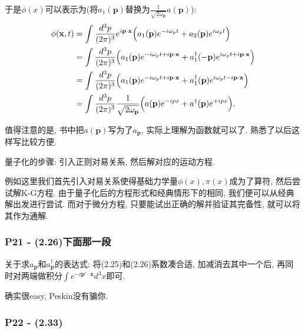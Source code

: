 \documentclass[cn,hazy,green,11pt,device=normal,chinesefont=founder]{elegantnote}
\begin{document}
于是$\phi(x)$可以表示为(将$a_1(\mathbf{p})$替换为$\frac{1}{\sqrt{2\omega_\mathbf{p}}} a(\mathbf{p})$): 
\begin{equation}
  \begin{aligned}
  \phi(\mathbf{x}, t) &= \int \frac{d^3 p}{(2\pi)^3}e^{i\mathbf{p \cdot x}}\Bigl(a_1(\mathbf{p})e^{-i\omega_p t} + a_2(\mathbf{p})e^{i\omega_p t}\Bigr) \\
  &= \int \frac{d^3 p}{(2\pi)^3}\Bigl(a_1(\mathbf{p})e^{-i\omega_p t +i\mathbf{p \cdot x}} + a_1^{\dagger}(-\mathbf{p})e^{i\omega_p t+i\mathbf{p \cdot x}}\Bigr) \\
  &= \int \frac{d^3 p}{(2\pi)^3}\Bigl(a_1(\mathbf{p})e^{-i\omega_p t + i\mathbf{p \cdot x}} + a_1^{\dagger}(\mathbf{p})e^{i\omega_p t - i\mathbf{p \cdot x}}\Bigr) \\
  &= \int \frac{d^3 p}{(2\pi)^3} \frac{1}{\sqrt{2 \omega_\mathbf{p}}} \Bigl(a(\mathbf{p})e^{-ipx} + a^{\dagger}(\mathbf{p})e^{+ipx}\Bigr). 
  \end{aligned}
\end{equation}

值得注意的是, 书中把$a(\mathbf{p})$写为了$a_\mathbf{p}$, 实际上理解为函数就可以了. 熟悉了以后这样写比较方便. 

\begin{remark}[个人理解]
  量子化的步骤: 引入正则对易关系, 然后解对应的运动方程. 
  
  例如这里我们首先引入对易关系使得基础力学量$\phi(x),\pi(x)$成为了算符, 然后尝试解K-G方程. 由于量子化后的方程形式和经典情形下的相同, 我们便可以从经典解出发进行尝试. 而对于微分方程, 只要能试出正确的解并验证其完备性, 就可以将其作为通解.  
\end{remark}

\subsubsection{P21 - (2.26)下面那一段}

关于求$a_\mathbf{p}$和$a^{\dagger}_\mathbf{p}$的表达式: 将(2.25)和(2.26)系数凑合适, 加减消去其中一个后, 再同时对两端做积分$\int e^{-i\mathbf{p'\cdot x}} d^3 x$即可. 

\begin{remark}
  确实很easy, Peskin没有骗你. 
\end{remark}

\subsubsection{P22 - (2.33)}
\end{document}
